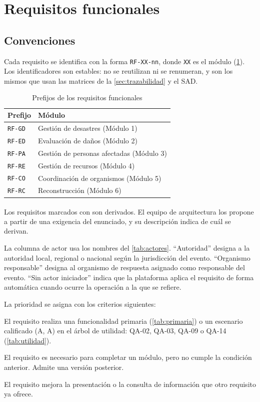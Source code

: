 \documentclass[11pt,letterpaper]{article}
\newcommand{\derivado}{\textsuperscript{\textdagger}}
\begin{document}
\section{Requisitos funcionales}
\label{sec:requisitos}

\subsection{Convenciones}
\label{sec:convenciones}

Cada requisito se identifica con la forma \texttt{RF-XX-nn}, donde \texttt{XX} es el módulo
(\cref{tab:prefijos}). Los identificadores son estables: no se reutilizan ni se renumeran, y son los
mismos que usan las matrices de la \cref{sec:trazabilidad} y el SAD.

\begin{table}[H]
\centering
\caption{Prefijos de los requisitos funcionales}\label{tab:prefijos}
\begin{tabular}{ll}
\toprule
\textbf{Prefijo} & \textbf{Módulo} \\
\midrule
\texttt{RF-GD} & Gestión de desastres (Módulo 1) \\
\texttt{RF-ED} & Evaluación de daños (Módulo 2) \\
\texttt{RF-PA} & Gestión de personas afectadas (Módulo 3) \\
\texttt{RF-RE} & Gestión de recursos (Módulo 4) \\
\texttt{RF-CO} & Coordinación de organismos (Módulo 5) \\
\texttt{RF-RC} & Reconstrucción (Módulo 6) \\
\bottomrule
\end{tabular}
\end{table}

Los requisitos marcados con \derivado{} son derivados. El equipo de arquitectura los propone a
partir de una exigencia del enunciado, y su descripción indica de cuál se derivan.

La columna de actor usa los nombres del \cref{tab:actores}. \enquote{Autoridad} designa a la
autoridad local, regional o nacional según la jurisdicción del evento. \enquote{Organismo
responsable} designa al organismo de respuesta asignado como responsable del evento.
\enquote{Sin actor iniciador} indica que la plataforma aplica el requisito de forma automática
cuando ocurre la operación a la que se refiere.

La prioridad se asigna con los criterios siguientes:

\begin{description}[leftmargin=1.6cm,labelwidth=1.3cm,labelsep=0.3cm]
  \item[Alta] El requisito realiza una funcionalidad primaria (\cref{tab:primaria}) o un escenario
        calificado (A, A) en el árbol de utilidad: QA-02, QA-03, QA-09 o QA-14
        (\cref{tab:utilidad}).
  \item[Media] El requisito es necesario para completar un módulo, pero no cumple la condición
        anterior. Admite una versión posterior.
  \item[Baja] El requisito mejora la presentación o la consulta de información que otro requisito
        ya ofrece.
\end{description}
\end{document}
